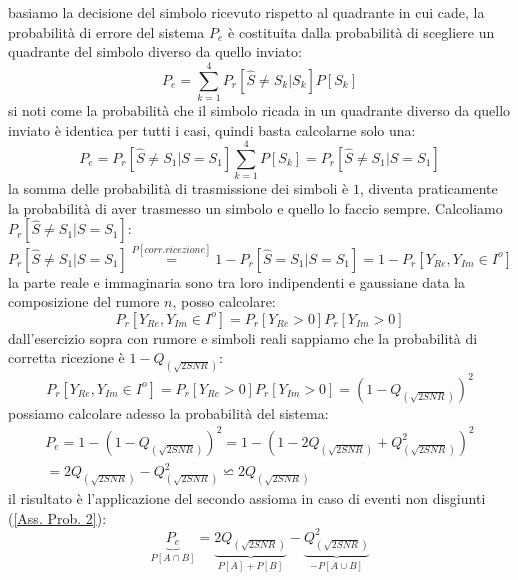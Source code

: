                 basiamo la decisione del simbolo ricevuto rispetto al quadrante in cui cade, la probabilità di errore del 
                sistema $P_e$ è costituita dalla probabilità di scegliere un quadrante del simbolo diverso da quello inviato:
                \[
                    P_e = \sum_{k=1}^{4} P_r[\hat{S} \neq S_k | S_k]P[S_k]
                \]
                si noti come la probabilità che il simbolo ricada in un quadrante diverso da quello inviato è identica per tutti i casi, 
                quindi basta calcolarne solo una: 
                \[
                    P_e = P_r[\hat{S} \neq S_1 | S=S_1]\sum_{k=1}^{4} P[S_k] = P_r[\hat{S} \neq S_1 | S=S_1]
                \]
                la somma delle probabilità di trasmissione dei simboli è $1$, diventa praticamente la probabilità di aver trasmesso un simbolo e quello lo faccio sempre.
                Calcoliamo $P_r[\hat{S} \neq S_1 | S=S_1]$:
                \[
                    P_r[\hat{S} \neq S_1 | S=S_1] \overset{P[corr. ricezione]}{=} 1-P_r[\hat{S} = S_1 | S=S_1] = 1-P_r[Y_{Re},Y_{Im} \in I^o ] 
                \]
                la parte reale e immaginaria sono tra loro indipendenti e gaussiane data la composizione del rumore $n$, posso calcolare:
                \[
                    P_r[Y_{Re},Y_{Im} \in I^o ] = P_r[Y_{Re}>0]P_r[Y_{Im}>0] 
                \]
                dall'esercizio sopra con rumore e simboli reali sappiamo che la probabilità di corretta ricezione è $1-Q_{(\sqrt{2SNR})}$:
                \[
                    P_r[Y_{Re},Y_{Im} \in I^o ] = P_r[Y_{Re}>0]P_r[Y_{Im}>0] = \left(1-Q_{(\sqrt{2SNR})}\right)^2
                \]
                possiamo calcolare adesso la probabilità del sistema:
                \begin{gather}
                    P_e = 1-\left(1-Q_{(\sqrt{2SNR})}\right)^2 =1-\left(1-2Q_{(\sqrt{2SNR})}+Q^2_{(\sqrt{2SNR})}\right)^2  \nonumber\\
                        = 2Q_{(\sqrt{2SNR})}-Q^2_{(\sqrt{2SNR})} \backsimeq 2Q_{(\sqrt{2SNR})}\nonumber
                \end{gather}
                il risultato è l'applicazione del secondo assioma in caso di eventi non disgiunti (\ref{Ass. Prob. 2}):
                \[    
                    \underset{P[A\cap B]}{\underbrace{P_e }}=\underset{P[A]+P[B]}{\underbrace{2Q_{(\sqrt{2SNR})}}}-\underset{-P[A\cup B]}{\underbrace{Q^2_{(\sqrt{2SNR})}}} 
                \]
                
          
    